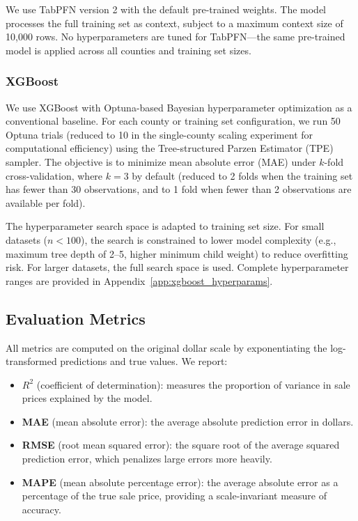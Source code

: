 We use TabPFN version 2 with the default pre-trained weights. The model processes the full training set as context, subject to a maximum context size of 10,000 rows. No hyperparameters are tuned for TabPFN---the same pre-trained model is applied across all counties and training set sizes.

\subsubsection{XGBoost}

We use XGBoost \citep{chen2016xgboost} with Optuna-based Bayesian hyperparameter optimization \citep{akiba2019optuna} as a conventional baseline. For each county or training set configuration, we run 50 Optuna trials (reduced to 10 in the single-county scaling experiment for computational efficiency) using the Tree-structured Parzen Estimator (TPE) sampler. The objective is to minimize mean absolute error (MAE) under $k$-fold cross-validation, where $k = 3$ by default (reduced to 2 folds when the training set has fewer than 30 observations, and to 1 fold when fewer than 2 observations are available per fold).

The hyperparameter search space is adapted to training set size. For small datasets ($n < 100$), the search is constrained to lower model complexity (e.g., maximum tree depth of 2--5, higher minimum child weight) to reduce overfitting risk. For larger datasets, the full search space is used. Complete hyperparameter ranges are provided in Appendix~\ref{app:xgboost_hyperparams}.

\subsection{Evaluation Metrics}\label{sec:metrics}

All metrics are computed on the original dollar scale by exponentiating the log-transformed predictions and true values. We report:

\begin{itemize}
    \item \textbf{$R^2$} (coefficient of determination): measures the proportion of variance in sale prices explained by the model.
    \item \textbf{MAE} (mean absolute error): the average absolute prediction error in dollars.
    \item \textbf{RMSE} (root mean squared error): the square root of the average squared prediction error, which penalizes large errors more heavily.
    \item \textbf{MAPE} (mean absolute percentage error): the average absolute error as a percentage of the true sale price, providing a scale-invariant measure of accuracy.
\end{itemize}
